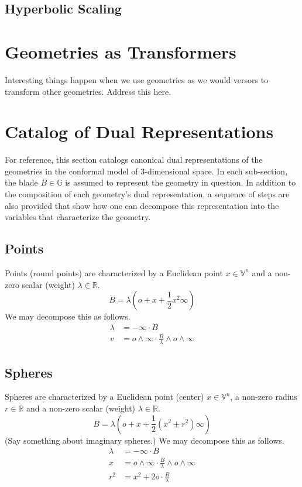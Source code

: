 \documentclass[12pt]{article}
\newcommand{\G}{\mathbb{G}}
\newcommand{\V}{\mathbb{V}}
\newcommand{\R}{\mathbb{R}}
\newcommand{\nvao}{o}
\newcommand{\nvai}{\infty}
\begin{document}
\subsection{Hyperbolic Scaling}

\section{Geometries as Transformers}

Interesting things happen when we use geometries as we would versors
to transform other geometries.  Address this here.

\section{Catalog of Dual Representations}

For reference, this section catalogs canonical dual representations of the geometries in the
conformal model of 3-dimensional space.  In each sub-section, the blade $B\in\G$ is
assumed to represent the geometry in question.  In addition to the composition
of each geometry's dual representation, a sequence of steps
are also provided that show how one can decompose this representation
into the variables that characterize the geometry.

\subsection{Points}

Points (round points) are characterized by a Euclidean point $x\in\V^n$ and
a non-zero scalar (weight) $\lambda\in\R$.
\begin{equation*}
B = \lambda\left(\nvao + x + \frac{1}{2}x^2\nvai\right)
\end{equation*}
We may decompose this as follows.
\begin{align*}
\lambda &= -\nvai\cdot B \\
v &= \nvao\wedge\nvai\cdot\frac{B}{\lambda}\wedge\nvao\wedge\nvai
\end{align*}

\subsection{Spheres}

Spheres are characterized by a Euclidean point (center) $x\in\V^n$, a
non-zero radius $r\in\R$ and a non-zero scalar (weight) $\lambda\in\R$.
\begin{equation*}
B = \lambda\left(\nvao + x + \frac{1}{2}(x^2\pm r^2)\nvai\right)
\end{equation*}
(Say something about imaginary spheres.)
We may decompose this as follows.
\begin{align*}
\lambda &= -\nvai\cdot B \\
x &= \nvao\wedge\nvai\cdot\frac{B}{\lambda}\wedge\nvao\wedge\nvai \\
r^2 &= x^2 + 2\nvao\cdot\frac{B}{\lambda}
\end{align*}
\end{document}
